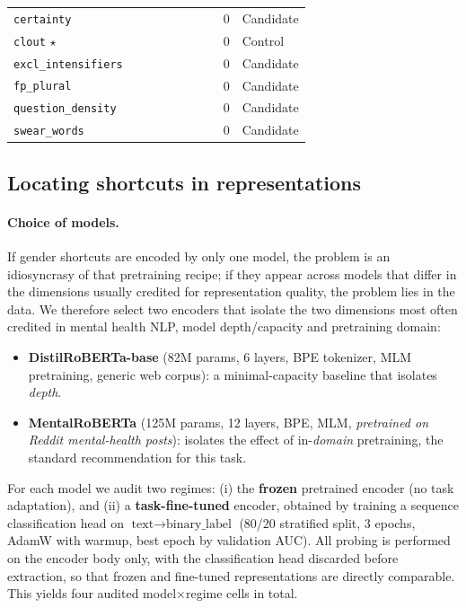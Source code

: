 \documentclass[11pt]{article}
\begin{document}
\begin{table}[t]
\begin{tabular}{@{}l ccccccc c l@{}}
\texttt{certainty}              &           &           &           &           &           &           &           & 0 & Candidate \\
\texttt{clout}$\,\star$         &           &           &           &           &           &           &           & 0 & Control \\
\texttt{excl\_intensifiers}     &           &           &           &           &           &           &           & 0 & Candidate \\
\texttt{fp\_plural}             &           &           &           &           &           &           &           & 0 & Candidate \\
\texttt{question\_density}      &           &           &           &           &           &           &           & 0 & Candidate \\
\texttt{swear\_words}           &           &           &           &           &           &           &           & 0 & Candidate \\
\bottomrule
\end{tabular}
\end{table}

\subsection{Locating shortcuts in representations}

\paragraph{Choice of models.}
If gender shortcuts are encoded by only one model, the problem is an idiosyncrasy of that pretraining recipe; if they appear across models that differ in the dimensions usually credited for representation quality, the problem lies in the data. We therefore select two encoders that isolate the two dimensions most often credited in mental health NLP, model depth/capacity and pretraining domain:
\begin{itemize}
\setlength\itemsep{0pt}
\item \textbf{DistilRoBERTa-base} (82M params, 6 layers, BPE tokenizer, MLM pretraining, generic web corpus): a minimal-capacity baseline that isolates \emph{depth}.
\item \textbf{MentalRoBERTa} \citep{ji2022mentalbert} (125M params, 12 layers, BPE, MLM, \emph{pretrained on Reddit mental-health posts}): isolates the effect of in-\emph{domain} pretraining, the standard recommendation for this task.
\end{itemize}
For each model we audit two regimes: (i) the \textbf{frozen} pretrained encoder (no task adaptation), and (ii) a \textbf{task-fine-tuned} encoder, obtained by training a sequence classification head on $\text{text} \to \text{binary\_label}$ (80/20 stratified split, 3 epochs, AdamW with warmup, best epoch by validation AUC). All probing is performed on the encoder body only, with the classification head discarded before extraction, so that frozen and fine-tuned representations are directly comparable. This yields four audited model$\times$regime cells in total.
\end{document}
